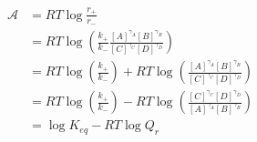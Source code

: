 \begin{eqnarray}\label{eqn:reaction-affinity-ratio}
\mathcal A &= RT\log\frac{r_+}{r_-} \\
& = RT\log\left(\frac{k_+}{k_-}\frac{[A]^{\gamma_A}[B]^{\gamma_B}}{[C]^{\gamma_C}[D]^{\gamma_D}}\right) \\
& = RT\log\left(\frac{k_+}{k_-}\right) + RT\log\left(\frac{[A]^{\gamma_A}[B]^{\gamma_B}}{[C]^{\gamma_C}[D]^{\gamma_D}}\right) \\
& = RT\log\left(\frac{k_+}{k_-}\right) - RT\log\left(\frac{[C]^{\gamma_C}[D]^{\gamma_D}}{[A]^{\gamma_A}[B]^{\gamma_B}}\right) \\
& =  \log K_{eq} - RT\log{Q_r} \\
\end{eqnarray}